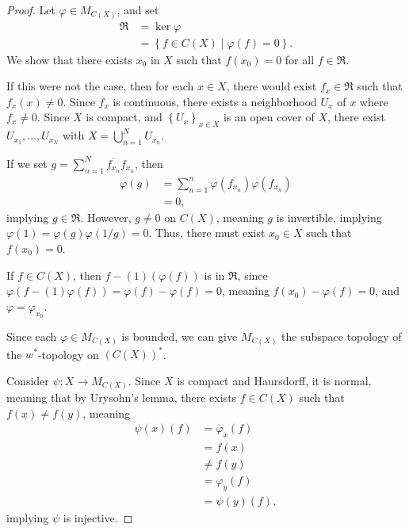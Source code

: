 \documentclass[10pt]{extarticle}
\newcommand{\set}[1]{\left\{#1\right\}}
\theoremstyle{plain}
\theoremstyle{definition}
\theoremstyle{note}
\renewcommand{\newline}{\hfill\break}
\begin{document}
\begin{proof}
  Let $\varphi \in M_{C(X)}$, and set
  \begin{align*}
    \mathfrak{R} &= \ker\varphi\\
                 &= \set{f\in C(X) \mid \varphi(f) = 0}.
  \end{align*}
  We show that there exists $x_0$ in $X$ such that $f(x_0) = 0$ for all $f\in \mathfrak{R}$.\newline

  If this were not the case, then for each $x\in X$, there would exist $f_x\in \mathfrak{R}$ such that $f_x(x) \neq 0$. Since $f_x$ is continuous, there exists a neighborhood $U_x$ of $x$ where $f_x\neq 0$. Since $X$ is compact, and $\set{U_x}_{x\in X}$ is an open cover of $X$, there exist $U_{x_1},\dots,U_{x_N}$ with $X = \bigcup_{n=1}^{N}U_{x_n}$.\newline

  If we set $g = \sum_{n=1}^{N}\overline{f_{x_n}}f_{x_n}$, then
  \begin{align*}
    \varphi(g) &= \sum_{n=1}^{n}\varphi\left(\overline{f_{x_n}}\right)\varphi\left(f_{x_n}\right)\\
               &= 0,
  \end{align*}
  implying $g\in \mathfrak{R}$. However, $g\neq 0$ on $C(X)$, meaning $g$ is invertible, implying $\varphi(1) = \varphi(g) \varphi(1/g) = 0$. Thus, there must exist $x_0\in X$ such that $f(x_0) = 0$.\newline

  If $f\in C(X)$, then $f - (1)(\varphi(f))$ is in $\mathfrak{R}$, since $\varphi\left(f - (1)\varphi(f)\right) = \varphi(f) - \varphi(f) = 0$, meaning $f(x_0) - \varphi(f) = 0$, and $\varphi = \varphi_{x_0}$.\newline

  Since each $\varphi \in M_{C(X)}$ is bounded, we can give $M_{C(X)}$ the subspace topology of the $w^{\ast}$-topology on $\left(C(X)\right)^{\ast}$.\newline

  Consider $\psi: X \rightarrow M_{C(X)}$. Since $X$ is compact and Haursdorff, it is normal, meaning that by Urysohn's lemma, there exists $f\in C(X)$ such that $f(x) \neq f(y)$, meaning
  \begin{align*}
    \psi(x)(f) &= \varphi_x(f)\\
               &= f(x)\\
               &\neq f(y)\\
               &= \varphi_y(f)\\
               &= \psi(y)(f),
  \end{align*}
  implying $\psi$ is injective.\newline


\end{proof}
\end{document}
